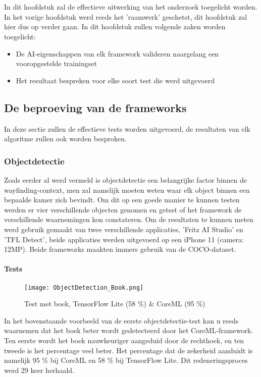 \chapter{}
\label{ch:onderzoek}
In dit hoofdstuk zal de effectieve uitwerking van het onderzoek toegelicht worden. In het vorige hoofdstuk werd reeds het 'raamwerk' geschetst, dit hoofdstuk zal hier dus op verder gaan. In dit hoofdstuk zullen volgende zaken worden toegelicht:

\begin{itemize}
	\item De AI-eigenschappen van elk framework valideren naargelang een vooropgestelde trainingset
	\item Het resultaat bespreken voor elke soort test die werd uitgevoerd
\end{itemize}

\section{De beproeving van de frameworks}
In deze sectie zullen de effectieve tests worden uitgevoerd, de resultaten van elk algoritme zullen ook worden besproken.

\subsection{Objectdetectie}

Zoals eerder al werd vermeld is objectdetectie een belangrijke factor binnen de wayfinding-context, men zal namelijk moeten weten waar elk object binnen een bepaalde kamer zich bevindt. Om dit op een goede manier te kunnen testen werden er vier verschillende objecten genomen en getest of het framework de verschillende waarnemingen kon constateren. Om de resultaten te kunnen meten werd gebruik gemaakt van twee verschillende applicaties, 'Fritz AI Studio' en 'TFL Detect', beide applicaties werden uitgevoerd op een iPhone 11 (camera: 12MP). Beide frameworks maakten immers gebruik van de COCO-dataset.


\subsubsection{Tests}
	\begin{figure}[H]
		\centering
		\texttt{[image: ObjectDetection\_Book.png]}
		\caption{Test met boek, TensorFlow Lite (58 \%) \& CoreML (95 \%)}
	\end{figure}
In het bovenstaande voorbeeld van de eerste objectdetectie-test kan u reeds waarnemen dat het boek beter wordt gedetecteerd door het CoreML-framework. Ten eerste wordt het boek nauwkeuriger aangeduid door de rechthoek, en ten tweede is het percentage veel beter. Het percentage dat de zekerheid aanduidt is namelijk 95 \% bij CoreML en 58 \% bij TensorFlow Lite. Dit redeneringsproces werd 29 keer herhaald.

